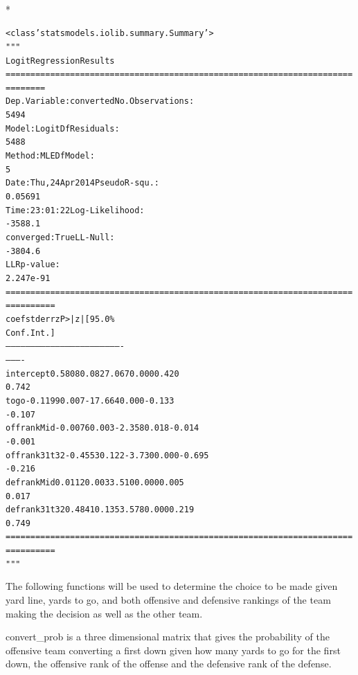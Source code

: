 \documentclass[letterpaper,10pt,english]{/anaconda/lib/python2.7/site-packages/sphinx/texinputs/sphinxhowto}
\def\smaller{\fontsize{9.5pt}{9.5pt}\selectfont}
\newenvironment{InvisibleVerbatim}
        {\begin{mdframed}[leftmargin=0.1\linewidth,innerleftmargin=3pt,innerrightmargin=3pt, userdefinedwidth=1\linewidth, linewidth=0pt, linecolor=white, usetwoside=false]}
        {\end{mdframed}}
\begin{document}
                \makebox[0.1\linewidth]{\smaller\hfill\tt\color{nbframe-out-prompt}Out\hspace{4pt}{[}19{]}:\hspace{4pt}}\\*
                \vspace{-2.55\baselineskip}\begin{InvisibleVerbatim}
                \vspace{-0.5\baselineskip}
\begin{alltt}<class 'statsmodels.iolib.summary.Summary'>
"""
                           Logit Regression Results
======================================================================
========
Dep. Variable:              converted   No. Observations:
5494
Model:                          Logit   Df Residuals:
5488
Method:                           MLE   Df Model:
5
Date:                Thu, 24 Apr 2014   Pseudo R-squ.:
0.05691
Time:                        23:01:22   Log-Likelihood:
-3588.1
converged:                       True   LL-Null:
-3804.6
                                        LLR p-value:
2.247e-91
======================================================================
==========
                   coef    std err          z      P>|z|      [95.0\%
Conf. Int.]
----------------------------------------------------------------------
----------
intercept        0.5808      0.082      7.067      0.000         0.420
0.742
togo            -0.1199      0.007    -17.664      0.000        -0.133
-0.107
offrankMid      -0.0076      0.003     -2.358      0.018        -0.014
-0.001
offrank31t32    -0.4553      0.122     -3.730      0.000        -0.695
-0.216
defrankMid       0.0112      0.003      3.510      0.000         0.005
0.017
defrank31t32     0.4841      0.135      3.578      0.000         0.219
0.749
======================================================================
==========
"""\end{alltt}

            \end{InvisibleVerbatim}
            
        
    

The following functions will be used to determine the choice to be made
given yard line, yards to go, and both offensive and defensive rankings
of the team making the decision as well as the other team.







convert\_prob is a three dimensional matrix that gives the probability
of the offensive team converting a first down given how many yards to go
for the first down, the offensive rank of the offense and the defensive
rank of the defense.
\end{document}
